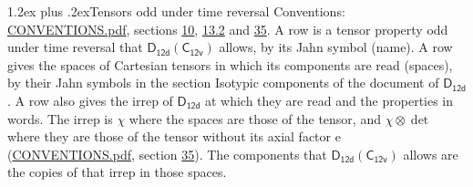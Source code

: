 \documentclass[10pt,a4paper]{article}
\makeatletter
\renewcommand\section{\@startsection{section}{1}{\z@}{-3ex plus -1ex minus -.2ex}%
  {1.2ex plus .2ex}{\normalfont\large\sffamily\bfseries\color{parttitle}}}
\numberwithin{equation}{section}
\newcommand{\grp}[1]{\mathsf{#1}}
\newcommand{\irrprod}{\otimes}
\makeatother
\begin{document}
\section{Tensors odd under time reversal}\label{s:time_odd}
Conventions: \href{../../CONVENTIONS.pdf}{CONVENTIONS.pdf}, sections \href{../../../rotation/CONVENTIONS.pdf\#conv.10}{10}, \href{../../../rotation/CONVENTIONS.pdf\#conv.13.2}{13.2} and \href{../../CONVENTIONS.pdf\#conv.35}{35}.
\leavevmode\label{n:head.name.property}A row is a tensor property odd under time reversal that $\grp{D_{12d}}(\grp{C_{12v}})$ allows, by its Jahn symbol (name). \label{n:head.spaces}A row gives the spaces of Cartesian tensors in which its components are read (spaces), by their Jahn symbols in the section Isotypic components of the document of \href{../../../rotation/data/pdf/D12d.pdf}{$\grp{D_{12d}}$}. \label{n:head.properties}A row also gives the irrep of $\grp{D_{12d}}$ at which they are read and the properties in words. The irrep is $\chi$ where the spaces are those of the tensor, and $\chi \irrprod \det$ where they are those of the tensor without its axial factor e (\href{../../CONVENTIONS.pdf}{CONVENTIONS.pdf}, section \href{../../CONVENTIONS.pdf\#conv.35}{35}). The components that $\grp{D_{12d}}(\grp{C_{12v}})$ allows are the copies of that irrep in those spaces.
\end{document}
